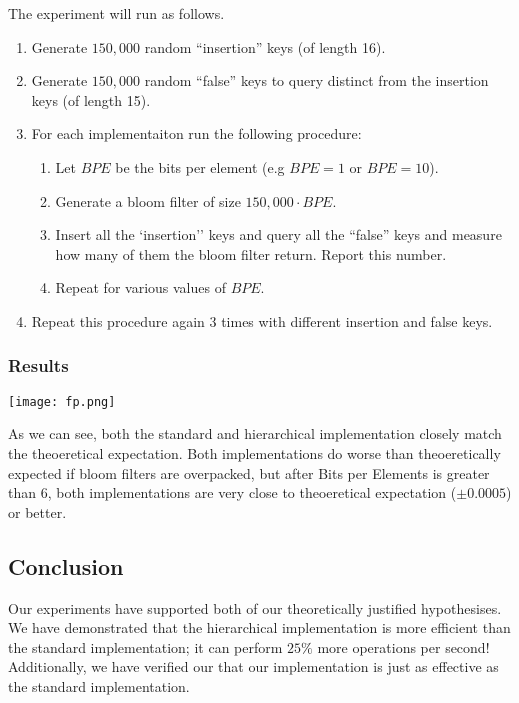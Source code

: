 The experiment will run as follows. 
\begin{enumerate}
\item Generate $150,000$ random ``insertion'' keys (of length 16).
\item Generate $150,000$ random ``false'' keys to query distinct from the insertion keys (of length 15).
\item For each implementaiton run the following procedure:
\begin{enumerate}
    \item Let $BPE$ be the bits per element (e.g $BPE = 1$ or $BPE = 10$).
    \item Generate a bloom filter of size $150,000\cdot BPE$.
    \item Insert all the `insertion'' keys and query all the ``false'' keys and measure how many of them the bloom filter return. Report this number.
    \item Repeat for various values of $BPE$.
\end{enumerate}
\item Repeat this procedure again $3$ times with different insertion and false keys.
\end{enumerate}

\subsubsection{Results}
\begin{center}
    \texttt{[image: fp.png]}
\end{center}

As we can see, both the standard and hierarchical implementation closely match the theoeretical expectation. 
Both implementations do worse than theoeretically expected if bloom filters are overpacked, but after Bits per Elements is greater than 6, both implementations are very close to theoeretical expectation ($\pm 0.0005$) or better.

\subsection{Conclusion}
Our experiments have supported both of our theoretically justified hypothesises.
We have demonstrated that the hierarchical implementation is more efficient than the standard implementation; it can perform $25\%$ more operations per second!
Additionally, we have verified our that our implementation is just as effective as the standard implementation. 
